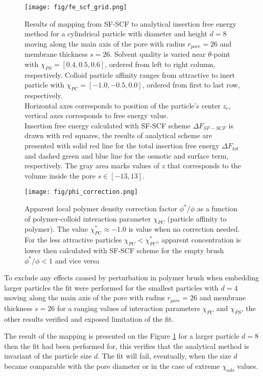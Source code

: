\documentclass[12pt, a4paper]{article}
\begin{document}
\begin{figure}
    \centering
    \texttt{[image: fig/fe\_scf\_grid.png]}
    \caption{
    Results of mapping from SF-SCF to analytical insertion free energy method for a cylindrical particle with diameter and height $d=8$ moving along the main axis of the pore with radius $r_{pore} = 26$ and membrane thickness $s=26$.
    Solvent quality is varied near $\theta$-point with $\chi_{PS} = [0.4, 0.5, 0.6]$, ordered from left to right column, respectively.
    Colloid particle affinity ranges from attractive to inert particle with $\chi_{PC} = [-1.0, -0.5, 0.0]$, ordered from first to last row, respectively.
    \\
    Horizontal axes corresponds to position of the particle's center $z_c$, vertical axes corresponds to free energy value.
    \\
    Insertion free energy calculated with SF-SCF scheme $\Delta F_{SF-SCF}$ is drawn with red squares, the results of analytical scheme are presented with solid red line for the total insertion free energy $\Delta F_{tot}$ and dashed green and blue line for the osmotic and surface term, respectively.
    The gray area marks values of $z$ that corresponds to the volume inside the pore $s\in [-13, 13]$.
    \label{fig:fe_scf_grid}
    }
\end{figure}

\begin{figure}
    \centering
    \texttt{[image: fig/phi\_correction.png]}
    \caption{
        Apparent local polymer density correction factor $\phi^{\ast}/\phi$ as a function of polymer-colloid interaction parameter $\chi_{PC}$ (particle affinity to polymer).
        The value $\chi_{PC}^{\ast} \approx -1.0$ is value when no correction needed. 
        For the less attractive particles $\chi_{PC}<\chi_{PC}^{\ast}$, apparent concentration is lower then calculated with SF-SCF scheme for the empty brush $\phi^{\ast}/\phi<1$ and vice versa
        }
    \label{fig:phi_correction}
\end{figure}

To exclude any effects caused by perturbation in polymer brush when embedding larger particles the fit were performed for the smallest particles with $d=4$ moving along the main axis of the pore with radius $r_{pore} = 26$ and membrane thickness $s=26$ for a ranging values of interaction parameters $\chi_{PC}$ and $\chi_{PS}$, the other results verified and exposed limitation of the fit.

The result of the mapping is presented on the Figure \ref{fig:fe_scf_grid} for a larger particle $d=8$ then the fit had been performed for, this verifies that the analytical method is invariant of the particle size $d$.
The fit will fail, eventually, when the size $d$ became comparable with the pore diameter or in the case of extreme $\chi_{ads}$ values.
\end{document}

